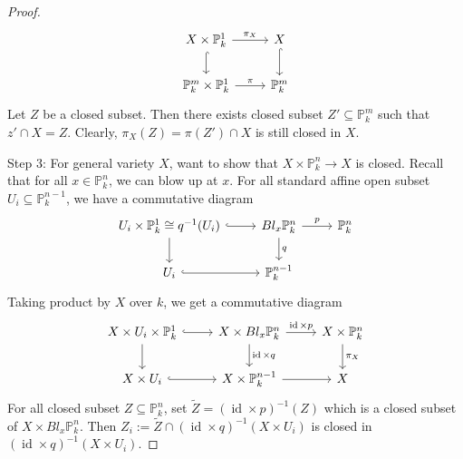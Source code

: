 \documentclass{ctexart}
\newcommand{\identity}{\operatorname{id}}
\begin{document}
\begin{proof}
    \begin{equation}
        \begin{tikzcd}
            X \times \mathbb{P}_{k}^{1} \arrow[r, "\pi_{X}"] \arrow[d, hookrightarrow] &
            X \arrow[d, hookrightarrow] \\
            \mathbb{P}_{k}^{m} \times \mathbb{P}_{k}^{1} \arrow[r, "\pi"] &
            \mathbb{P}_{k}^{m}
        \end{tikzcd}
    \end{equation}
    Let $Z$ be a closed subset.
    Then there exists closed subset $Z' \subseteq \mathbb{P}_{k}^{m}$ such that $z' \cap X = Z$.
    Clearly, $\pi_{X}(Z) = \pi(Z') \cap X$ is still closed in $X$.
    \par
    Step 3: For general variety $X$, want to show that $X \times \mathbb{P}_{k}^{n} \rightarrow X$ is closed.
    Recall that for all $x\in \mathbb{P}_{k}^{n}$, we can blow up at $x$.
    For all standard affine open subset $U_{i} \subseteq \mathbb{P}_{k}^{n - 1}$, we have a commutative diagram
    \begin{equation}
        \begin{tikzcd}
            U_{i} \times \mathbb{P}_{k}^{1} \cong q^{-1}(U_{i}) \arrow[r, hookrightarrow] \arrow[d] &
            Bl_{x}\mathbb{P}_{k}^{n} \arrow[r, "p"] \arrow[d, "q"] &
            \mathbb{P}_{k}^{n} \\
            U_{i} \arrow[r, hookrightarrow] &
            \mathbb{P}_{k}^{n - 1} & 
        \end{tikzcd}
    \end{equation}
    Taking product by $X$ over $k$, we get a commutative diagram
    \begin{equation}
        \begin{tikzcd}
            X \times U_{i} \times \mathbb{P}_{k}^{1} \arrow[r, hookrightarrow] \arrow[d] &
            X \times Bl_{x}\mathbb{P}_{k}^{n} \arrow[r, "\identity \times p"] \arrow[d, "\identity \times q"] &
            X \times \mathbb{P}_{k}^{n} \arrow[d, "\pi_{X}"] \\
            X \times U_{i} \arrow[r, hookrightarrow] &
            X \times \mathbb{P}_{k}^{n - 1} \arrow[r] & 
            X
        \end{tikzcd}
    \end{equation}
    For all closed subset $Z \subseteq \mathbb{P}_{k}^{n}$, 
    set $\widetilde{Z} = (\identity \times p)^{-1}(Z)$ which is a closed subset of $X \times Bl_{x}\mathbb{P}_{k}^{n}$.
    Then $Z_{i} := \widetilde{Z} \cap (\identity \times q)^{-1}(X \times U_{i})$ is closed in $(\identity \times q)^{-1}(X \times U_{i})$.

\end{proof}
\end{document}

